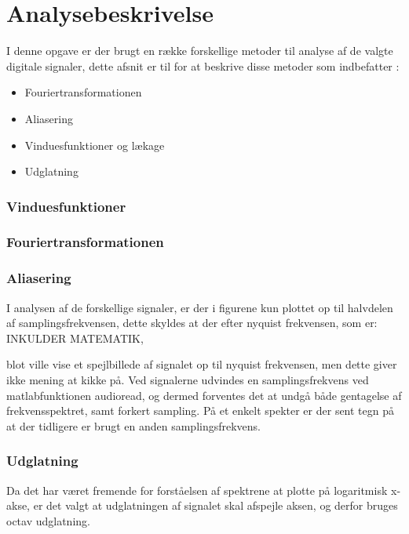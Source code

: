 \chapter{Analysebeskrivelse}\label{ch:analysebeskrivelse}

I denne opgave er der brugt en række forskellige metoder til analyse af de valgte digitale signaler, dette afsnit er til for at beskrive disse metoder som indbefatter :
\begin{itemize}
\item Fouriertransformationen
\item Aliasering
\item Vinduesfunktioner og lækage
\item Udglatning
\end{itemize}
 
\subsection{Vinduesfunktioner} 
 
\subsection{Fouriertransformationen}


\subsection{Aliasering}
I analysen af de forskellige signaler, er der i figurene kun plottet op til halvdelen af samplingsfrekvensen, dette skyldes at der efter nyquist frekvensen, som er: INKULDER MATEMATIK, 

blot ville vise et spejlbillede af signalet op til nyquist frekvensen, men dette giver ikke mening at kikke på. Ved signalerne udvindes en samplingsfrekvens ved matlabfunktionen audioread, og dermed forventes det at undgå både gentagelse af frekvensspektret, samt forkert sampling. På et enkelt spekter er der sent tegn på at der tidligere er brugt en anden samplingsfrekvens.

\subsection{Udglatning}

Da det har været fremende for forståelsen af spektrene at plotte på logaritmisk x-akse, er det valgt at udglatningen af signalet skal afspejle aksen, og derfor bruges octav udglatning.



